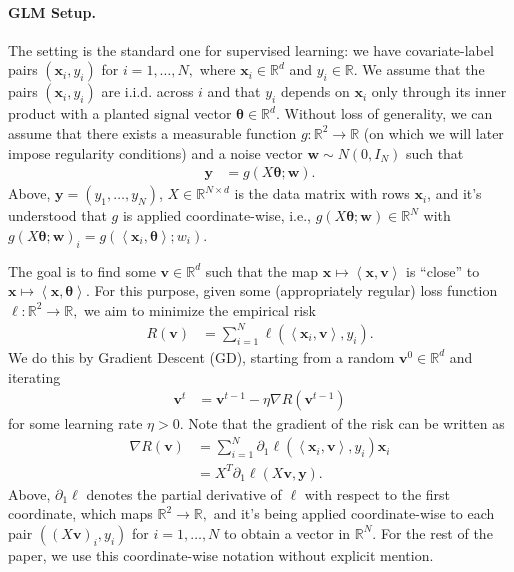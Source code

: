 \documentclass{article}
\newcommand{\1}{\mathbbm{1}}
\theoremstyle{plain}
\theoremstyle{definition}
\theoremstyle{remark}
\newcommand{\bfy}{\boldsymbol{y}}
\newcommand{\bfv}{\boldsymbol{v}}
\newcommand{\bftheta}{\boldsymbol{\theta}}
\newcommand{\bfw}{\boldsymbol{w}}
\newcommand{\R}{\mathbb{R}}
\newcommand{\brac}[1]{\left\langle #1\right\rangle}
\newcommand{\bfx}{\bm{x}}
\begin{document}
\paragraph{GLM Setup.} The setting is the standard one for supervised learning: we have covariate-label pairs $(\bfx_i,y_i)$ for $i=1,\dots,N,$ where $\bfx_i \in \R^d$ and $y_i \in \R.$ We assume that the pairs $(\bfx_i,y_i)$ are i.i.d. across $i$ and that $y_i$ depends on $\bfx_i$ only through its inner product with a planted signal vector $\bftheta \in \R^d$. Without loss of generality, we can assume that there exists a measurable function $g :\R^2\to\R$ (on which we will later  impose regularity conditions) and a noise vector $\bfw \sim N(0, I_N)$ such that
\begin{align*}
    \bfy &= g(X\bftheta ; \bfw).
\end{align*}
Above, $\bfy = (y_1,\dots,y_N)$, $X\in \R^{N\times d}$ is the data matrix with rows $\bfx_i$, and it's understood that $g$ is applied coordinate-wise, i.e., $g(X\bftheta ; \bfw) \in \R^N$ with $g(X\bftheta ; \bfw)_i = g(\brac{\bfx_i,\bftheta}; w_i).$

The goal is to find some $\bfv\in \R^d$ such that the map $\bfx\mapsto \brac{\bfx, \bfv}$ is ``close'' to $\bfx\mapsto \brac{\bfx, \bftheta}.$ For this purpose, given some (appropriately regular) loss function $\ell:\R^2\to\R,$ we aim to minimize the empirical risk
\begin{align*}
    R(\bfv) &= \sum_{i=1}^N \ell(\brac{\bfx_i, \bfv},y_i).
\end{align*}
We do this by Gradient Descent (GD), starting from a random $\bfv^0 \in \R^d$ and iterating
\begin{align}\label{eq:gradient-descent-iteration}
    \bfv^t &= \bfv^{t-1} - \eta \nabla R(\bfv^{t-1})
\end{align}
for some learning rate $\eta>0.$ Note that the gradient of the risk can be written as
\begin{align*}
    \nabla R(\bfv) &= \sum_{i=1}^N \partial_1 \ell(\brac{\bfx_i,\bfv}, y_i) \bfx_i \\
    &= X^T \partial_1 \ell(X\bfv, \bfy).
\end{align*}
Above, $\partial_1\ell$ denotes the partial derivative of $\ell$ with respect to the first coordinate, which maps $\R^2\to\R,$ and it's being applied coordinate-wise to each pair $((X\bfv)_i, y_i)$ for $i=1,\dots,N$ to obtain a vector in $\R^N.$ For the rest of the paper, we use this coordinate-wise notation without explicit mention.
\end{document}
